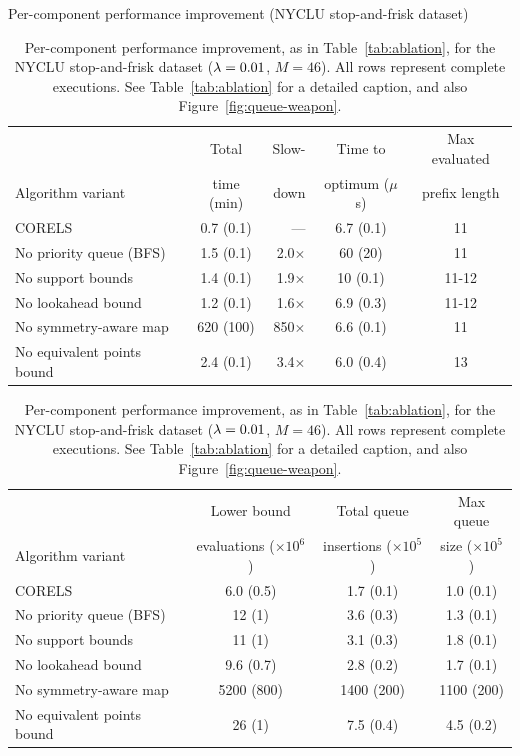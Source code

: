 \begin{table}[t!]
\centering
Per-component performance improvement (NYCLU stop-and-frisk dataset) \\
\vspace{1mm}
\begin{tabular}{l | c  r | c | c}
& Total & Slow- & Time to & Max evaluated \\
Algorithm variant & time (min) & down & optimum ($\mu$s) & prefix length \\
\hline
CORELS & 0.7 (0.1) & --- & 6.7 (0.1) & 11 \\
No priority queue (BFS) & 1.5 (0.1) & 2.0$\times$ & 60 (20) & 11 \\
No support bounds & 1.4 (0.1) & 1.9$\times$ & 10 (0.1) & 11-12 \\
No lookahead bound & 1.2 (0.1) & 1.6$\times$ & 6.9 (0.3) & 11-12 \\
No symmetry-aware map & 620 (100) & 850$\times$ & 6.6 (0.1) & 11 \\
No equivalent points bound & 2.4 (0.1) & 3.4$\times$ & 6.0 (0.4) & 13 \\
\hline
\end{tabular}
\begin{tabular}{l | c | c | c}
\hline
 & Lower bound & Total queue &  Max queue \\
Algorithm variant & evaluations ($\times 10^6$) & insertions ($\times 10^5$) & size ($\times 10^5$) \\
\hline
CORELS & 6.0 (0.5) & 1.7 (0.1) & 1.0 (0.1) \\
No priority queue (BFS) & 12 (1) & 3.6 (0.3) & 1.3 (0.1) \\
No support bounds & 11 (1) & 3.1 (0.3) & 1.8 (0.1) \\
No lookahead bound & 9.6 (0.7) & 2.8 (0.2) & 1.7 (0.1) \\
No symmetry-aware map & 5200 (800) & 1400 (200) & 1100 (200) \\
No equivalent points bound & 26 (1) & 7.5 (0.4) & 4.5 (0.2) \\
\end{tabular}
\caption{Per-component performance improvement, as in Table~\ref{tab:ablation},
for the NYCLU stop-and-frisk dataset (${{\lambda} = 0.01}$, ${M = 46}$).
%
All rows represent complete executions.
%
See Table~\ref{tab:ablation} for a detailed caption,
and also Figure~\ref{fig:queue-weapon}.
}
\vspace{4mm}
\label{tab:ablation-weapon}
\end{table}

